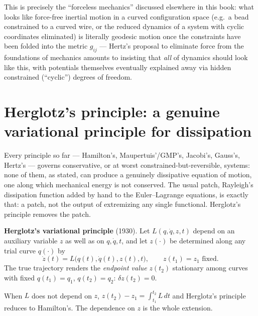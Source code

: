 This is precisely the ``forceless mechanics'' discussed elsewhere in this book:
what looks like force-free inertial motion in a curved configuration space
(e.g.\ a bead constrained to a curved wire, or the reduced dynamics of a system
with cyclic coordinates eliminated) is literally geodesic motion once the
constraints have been folded into the metric $g_{ij}$ --- Hertz's proposal to
eliminate force from the foundations of mechanics amounts to insisting that
\emph{all} of dynamics should look like this, with potentials themselves
eventually explained away via hidden constrained (``cyclic'') degrees of
freedom.

\section{Herglotz's principle: a genuine variational principle for dissipation}
\label{sec:vp-herglotz}

Every principle so far --- Hamilton's, Maupertuis'/GMP's, Jacobi's, Gauss's,
Hertz's --- governs conservative, or at worst constrained-but-reversible,
systems: none of them, as stated, can produce a genuinely dissipative equation
of motion, one along which mechanical energy is not conserved. The usual patch,
Rayleigh's dissipation function added by hand to the Euler--Lagrange equations,
is exactly that: a patch, not the output of extremizing any single functional.
Herglotz's principle removes the patch.

\begin{definition}
\textbf{Herglotz's variational principle} (1930). Let $L(q,\dot q,z,t)$ depend
    on an auxiliary variable $z$ as well as on $q,\dot q,t$, and let $z(\cdot)$
    be determined along any trial curve $q(\cdot)$ by
\[
\dot z(t) = L\big(q(t),\dot q(t), z(t), t\big), \qquad z(t_1)=z_1 \text{ fixed}.
\]
The true trajectory renders the \emph{endpoint value} $z(t_2)$ stationary among
    curves with fixed $q(t_1)=q_1$, $q(t_2)=q_2$: $\delta z(t_2) = 0$.
\end{definition}

When $L$ does not depend on $z$, $z(t_2)-z_1=\int_{t_1}^{t_2}L\,dt$ and
Herglotz's principle reduces to Hamilton's. The dependence on $z$ is the whole
extension.


